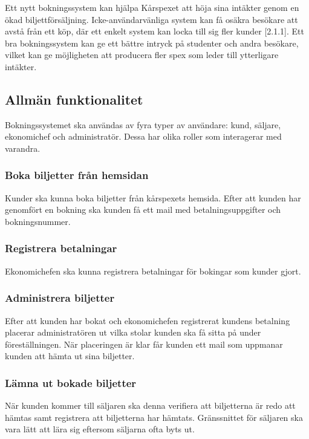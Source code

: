\documentclass[a4paper, twoside, 11pt, titlepage]{article}
\begin{document}
	Ett nytt bokningssystem kan hjälpa Kårspexet att höja sina intäkter genom en ökad biljettförsäljning. Icke-användarvänliga system kan få osäkra besökare att avstå från ett köp, där ett enkelt system kan locka till sig fler kunder [2.1.1]. Ett bra bokningssystem kan ge ett bättre intryck på studenter och andra besökare, vilket kan ge möjligheten att producera fler spex som leder till ytterligare intäkter.

	\subsection{Allmän funktionalitet}


	Bokningssystemet ska användas av fyra typer av användare: kund, säljare, ekonomichef och administratör. Dessa har olika roller som interagerar med varandra.

	\subsubsection{Boka biljetter från hemsidan}


		Kunder ska kunna boka biljetter från kårspexets hemsida. Efter att kunden har genomfört en bokning ska kunden få ett mail med betalningsuppgifter och bokningsnummer.

	\subsubsection{Registrera betalningar}


		Ekonomichefen ska kunna registrera betalningar för bokingar som kunder gjort.

	\subsubsection{Administrera biljetter}


		Efter att kunden har bokat och ekonomichefen registrerat kundens betalning placerar administratören ut vilka stolar kunden ska få sitta på under föreställningen. När placeringen är klar får kunden ett mail som uppmanar kunden att hämta ut sina biljetter.

	\subsubsection{Lämna ut bokade biljetter}


		När kunden kommer till säljaren ska denna verifiera att biljetterna är redo att hämtas samt registrera att biljetterna har hämtats. Gränssnittet för säljaren ska vara lätt att lära sig eftersom säljarna ofta byts ut.
\end{document}

